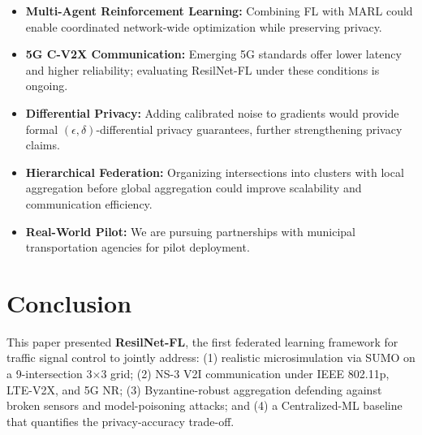 \documentclass[conference]{IEEEtran}
\begin{document}
\begin{itemize}
    \item \textbf{Multi-Agent Reinforcement Learning:} Combining FL with MARL could enable coordinated network-wide optimization while preserving privacy.

    \item \textbf{5G C-V2X Communication:} Emerging 5G standards offer lower latency and higher reliability; evaluating ResilNet-FL under these conditions is ongoing.

    \item \textbf{Differential Privacy:} Adding calibrated noise to gradients would provide formal $(\epsilon, \delta)$-differential privacy guarantees, further strengthening privacy claims.

    \item \textbf{Hierarchical Federation:} Organizing intersections into clusters with local aggregation before global aggregation could improve scalability and communication efficiency.

    \item \textbf{Real-World Pilot:} We are pursuing partnerships with municipal transportation agencies for pilot deployment.
\end{itemize}

\section{Conclusion}
This paper presented \textbf{ResilNet-FL}, the first federated learning framework for traffic signal control to jointly address: (1) realistic microsimulation via SUMO on a 9-intersection 3$\times$3 grid; (2) NS-3 V2I communication under IEEE 802.11p, LTE-V2X, and 5G NR; (3) Byzantine-robust aggregation defending against broken sensors and model-poisoning attacks; and (4) a Centralized-ML baseline that quantifies the privacy-accuracy trade-off.
\end{document}
